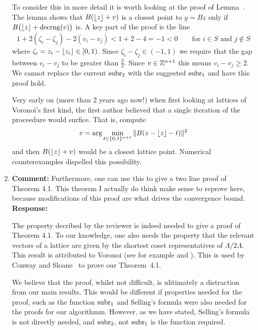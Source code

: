 \documentclass[a4paper,10pt]{article}
\begin{document}
\begin{enumerate}
To consider this in more detail it is worth looking at the proof of Lemma~.  The lemma shows that $B({\left\lfloor z \right\rfloor} + v)$ is a closest point to $y = Bz$ only if $B\big({\left\lfloor z \right\rfloor} + \operatorname{decrng}(v)\big)$ is.  A key part of the proof is the line
\[
1 + 2(\zeta_i-\zeta_j) - 2(v_i - v_j) < 1 + 2 - 4 = -1 < 0 \qquad \text{for $i \in S$ and $j \notin S$}
\]
where $\zeta_i = z_i - {\left\lfloor z_i \right\rfloor} \in [0,1)$.  Since $\zeta_i-\zeta_j \in (-1,1)$ we require that the gap between $v_i - v_j$ to be greater than $\tfrac{3}{2}$.  Since $v \in {\mathbb Z}^{n+1}$ this means $v_i - v_j \geq 2$.  We cannot replace the current $\operatorname{subr}_2$ with the suggested $\operatorname{subr}_1$ and have this proof hold.

Very early on (more than 2 years ago now!) when first looking at lattices of Voronoi's first kind, the first author believed that a single iteration of the proceedure would surfice.  That is, compute
\[
v = \arg\min_{t \in \{0,1\}^{n+1}}\| B(z - {\left\lfloor z \right\rfloor} - t) \|^2
\]
and then $B({\left\lfloor z \right\rfloor} + v)$ would be a closest lattice point.  Numerical counterexamples dispelled this possibility.

\item\textbf{Comment:} \label{com:provethm4.1}
Furthermore, one can use this to give a two line proof of Theorem 4.1.  This theorem I actually do think make sense to reprove here, because modifications of this proof are what drives the convergence bound. 
\\\textbf{Response:}

The property decribed by the reviewer is indeed needed to give a proof of Theorem 4.1.  To our knowledge, one also needs the property that the relevant vectors of a lattice are given by the shortest coset representatives of $\Lambda / 2\Lambda$.  This result is attributed to Voronoi (see for example \cite[Theorem~2]{ConwaySloane1992_voronoi_lattice_3d_obtuse_superbases} and \cite[Theorem~3.2]{MicciancioVoulgaris_deterministic_jv_2013}).  This is used by Conway and Sloane~\cite[Theorem~3]{ConwaySloane1992_voronoi_lattice_3d_obtuse_superbases} to prove our Theorem~4.1.

We believe that the proof, whilst not difficult, is ulitimately a distraction from our main results.  This would be different if properties needed for the proof, such as the function $\operatorname{subr}_1$ and Selling's formula were also needed for the proofs for our algorithmm.  However, as we have stated, Selling's formula is not directly needed, and $\operatorname{subr}_2$, not $\operatorname{subr}_1$ is the function required. 


\end{enumerate}
\end{document}
